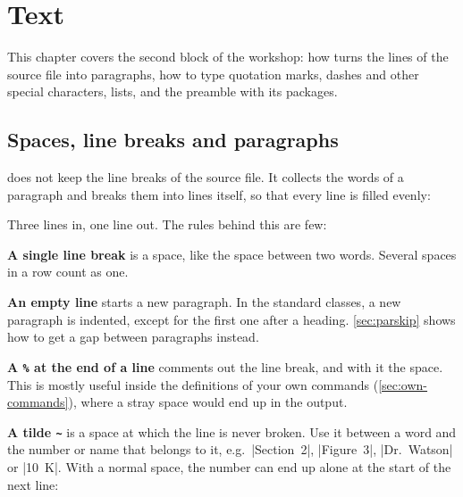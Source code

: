 \chapter{Text}\label{chap:text}

This chapter covers the second block of the workshop:
how  turns the lines of the source file into paragraphs,
how to type quotation marks, dashes and other special characters,
lists, and the preamble with its packages.

\section{Spaces, line breaks and paragraphs}\label{sec:spaces}

 does not keep the line breaks of the source file.
It collects the words of a paragraph and breaks them into lines itself,
so that every line is filled evenly:


Three lines in, one line out.
The rules behind this are few:

\textbf{A single line break} is a space, like the space between two words.
Several spaces in a row count as one.


\textbf{An empty line} starts a new paragraph.
In the standard classes, a new paragraph is indented,
except for the first one after a heading.
\autoref{sec:parskip} shows how to get a gap between paragraphs instead.


\textbf{A \texttt{\%} at the end of a line} comments out the line break, and with it the space.
This is mostly useful inside the definitions of your own commands (\autoref{sec:own-commands}),
where a stray space would end up in the output.


\textbf{A tilde \texttt{\textasciitilde}} is a space at which the line is never broken.
Use it between a word and the number or name that belongs to it,
e.g.\ \code|Section~2|, \code|Figure~3|, \code|Dr.~Watson| or \code|10~K|.
With a normal space, the number can end up alone at the start of the next line:



